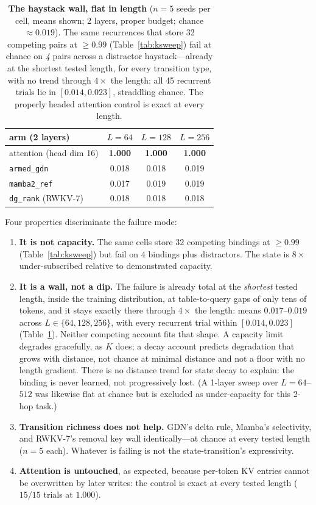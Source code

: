 \documentclass{article}
\newcommand{\armed}{\texttt{armed\_gdn}}
\newcommand{\dgrank}{\texttt{dg\_rank}}
\newcommand{\mambaref}{\texttt{mamba2\_ref}}
\begin{document}
\begin{table}[t]
\centering
\caption{\textbf{The haystack wall, flat in length} ($n{=}5$ seeds per cell, means shown; 2 layers, proper budget; chance $\approx 0.019$). The same recurrences that store 32 competing pairs at $\ge 0.99$ (Table~\ref{tab:ksweep}) fail at chance on \emph{4} pairs across a distractor haystack---already at the shortest tested length, for every transition type, with no trend through $4\times$ the length: all 45 recurrent trials lie in $[0.014, 0.023]$, straddling chance. The properly headed attention control is exact at every length.}
\label{tab:wall}
\vskip 0.1in
\small
\begin{tabular}{lccc}
\toprule
arm (2 layers) & $L{=}64$ & $L{=}128$ & $L{=}256$ \\
\midrule
attention (head dim 16) & \textbf{1.000} & \textbf{1.000} & \textbf{1.000} \\
\armed{} & 0.018 & 0.018 & 0.019 \\
\mambaref{} & 0.017 & 0.019 & 0.019 \\
\dgrank{} (RWKV-7) & 0.018 & 0.018 & 0.018 \\
\bottomrule
\end{tabular}
\end{table}

Four properties discriminate the failure mode:

\begin{enumerate}[leftmargin=1.4em,itemsep=2pt]
\item \textbf{It is not capacity.} The same cells store $32$ competing bindings at $\ge 0.99$ (Table~\ref{tab:ksweep}) but fail on $4$ bindings plus distractors. The state is $8\times$ under-subscribed relative to demonstrated capacity.
\item \textbf{It is a wall, not a dip.} The failure is already total at the \emph{shortest} tested length, inside the training distribution, at table-to-query gaps of only tens of tokens, and it stays exactly there through $4\times$ the length: means $0.017$--$0.019$ across $L\in\{64,128,256\}$, with every recurrent trial within $[0.014, 0.023]$ (Table~\ref{tab:wall}). Neither competing account fits that shape. A capacity limit degrades gracefully, as $K$ does; a decay account \citep{echo2026} predicts degradation that grows with distance, not chance at minimal distance and not a floor with no length gradient. There is no distance trend for state decay to explain: the binding is never learned, not progressively lost. (A 1-layer sweep over $L{=}64$--$512$ was likewise flat at chance but is excluded as under-capacity for this 2-hop task.)
\item \textbf{Transition richness does not help.} GDN's delta rule, Mamba's selectivity, and RWKV-7's removal key wall identically---at chance at every tested length ($n{=}5$ each). Whatever is failing is not the state-transition's expressivity.
\item \textbf{Attention is untouched}, as expected, because per-token KV entries cannot be overwritten by later writes: the control is exact at every tested length ($15/15$ trials at $1.000$).
\end{enumerate}
\end{document}
